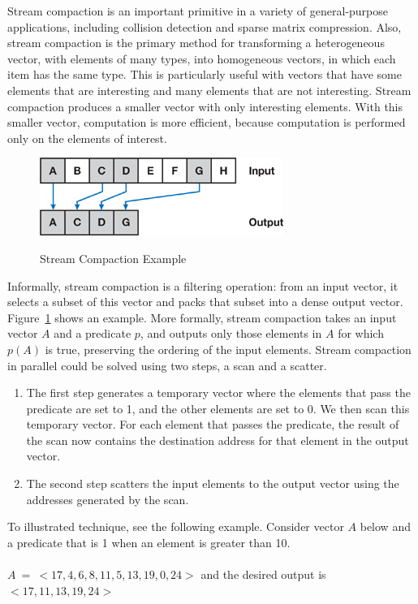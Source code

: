 \documentclass[Ingles]{ic-tese-v1}
\begin{document}
Stream compaction is an important primitive in a variety of general-purpose applications, including collision detection and sparse matrix compression. Also, stream compaction is the primary method for transforming a heterogeneous vector, with elements of many types, into homogeneous vectors, in which each item has the same type. This is particularly useful with vectors that have some elements that are interesting and many elements that are not interesting. Stream compaction produces a smaller vector with only interesting elements. With this smaller vector, computation is more efficient, because computation is performed only on the  elements of interest.\\
\begin{figure}[t]
	\centering
	\caption{Stream Compaction Example}
	\includegraphics[scale=1.2]{images/stremexample.jpg}
	\label{fig:streamexample}
\end{figure}
Informally, stream compaction is a filtering operation: from an input vector, it selects a subset of this vector and packs that subset into a dense output vector. Figure~\ref{fig:streamexample} shows an example. More formally, stream compaction takes an input vector $A$ and a predicate $p$, and outputs only those elements in $A$ for which $p(A)$ is true, preserving the ordering of the input elements.
Stream compaction in parallel could be solved using two steps, a scan and a scatter.
\begin{enumerate}
\item The first step generates a temporary vector where the elements that pass the predicate are set to 1, and the other elements are set to 0. We then scan this temporary vector. For each element that passes the predicate, the result of the scan now contains the destination address for that element in the output vector.
\item The second step scatters the input elements to the output vector using the addresses generated by the scan.
\end{enumerate}
To illustrated  technique, see the following example.
Consider  vector $A$ below and a predicate that is 1 when an element is greater than 10.\\\\
$A \: = \: <17, 4, 6, 8, 11, 5, 13, 19, 0, 24>$ and the desired output is   $<17, 11, 13, 19, 24>$\\\\
\end{document}
